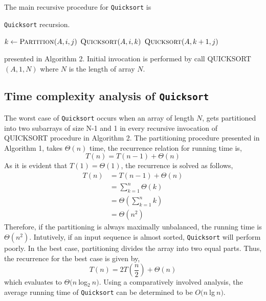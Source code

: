 \documentclass[10pt, twocolumn, a4paper]{article}
\let\smca\textsc
\let\cour\texttt
\begin{document}
\indent The main recursive procedure for \cour{Quicksort} is
\begin{algorithm}
  \caption{\cour{Quicksort} recursion.}
  \label{algo:quicksort}
  \begin{algorithmic}[1]
    \newline
      \State $k\gets\smca{Partition}(A,i,j)$
      \State $\smca{Quicksort}(A,i,k)$
      \State $\smca{Quicksort}(A,k+1,j)$
    \EndIf
    \EndProcedure
  \end{algorithmic}
\end{algorithm}
\noindent\newline presented in Algorithm 2. Initial invocation is performed by call QUICKSORT$(A,1,N)$ where $N$ is the length of array $N$.
\subsection{Time complexity analysis of \cour{Quicksort}}
The worst case of \cour{Quicksort} occurs when an array of length $N$, gets partitioned into two subarrays of size N-1 and 1 in every recursive invocation of QUICKSORT procedure in Algorithm 2. The partitioning procedure presented in Algorithm 1, takes $\Theta(n)$ time, the recurrence relation for running time is, $$T(n) = T(n-1) + \Theta(n)$$
As it is evident that $T(1) = \Theta(1)$, the recurrence is solved as follows,
\begin{align*}
  T(n) &= T(n-1) + \Theta(n) \\
  &=\sum_{k=1}^{n}\Theta(k) \\
  &= \Theta\left(\sum_{k=1}^{n}k\right) \\
  &=\Theta(n^2)
\end{align*}
\indent Therefore, if the partitioning is always maximally unbalanced, the running time is $\Theta(n^2)$. Intutively, if an input sequence is almost sorted, \cour{Quicksort} will perform poorly. In the best case, partitioning divides the array into two equal parts. Thus, the recurrence for the best case is given by, $$T(n) = 2T\left(\frac{n}{2}\right)+\Theta(n)$$
which evaluates to $\Theta(n\:$log$_2\:n)$. Using a comparatively involved analysis, the average running time of \cour{Quicksort} can be determined to be $O(n\:$lg$\:n)$.
\end{document}
